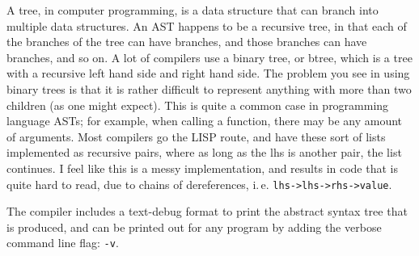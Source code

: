 \documentclass[12pt]{report}
\newcommand\ie{i.\,e.}
\begin{document}
A tree, in computer programming, is a data structure that can branch into multiple data structures. An AST happens to be a recursive tree, in that each of the branches of the tree can have branches, and those branches can have branches, and so on. A lot of compilers use a binary tree, or btree, which is a tree with a recursive left hand side and right hand side. The problem you see in using binary trees is that it is rather difficult to represent anything with more than two children (as one might expect). This is quite a common case in programming language ASTs; for example, when calling a function, there may be any amount of arguments. Most compilers go the LISP route, and have these sort of lists implemented as recursive pairs, where as long as the lhs is another pair, the list continues. I feel like this is a messy implementation, and results in code that is quite hard to read, due to chains of dereferences, \ie{} \verb|lhs->lhs->rhs->value|.

The compiler includes a text-debug format to print the abstract syntax tree that is produced, and can be printed out for any program by adding the verbose command line flag: \verb|-v|.
\end{document}
